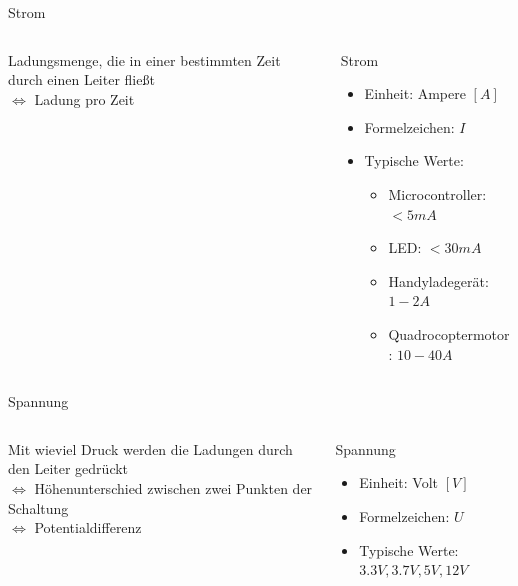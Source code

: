\documentclass[aspectratio=169]{beamer}
\begin{document}
\begin{frame}{Strom}
    \begin{columns}
        \begin{column}{0.5\textwidth}
            Ladungsmenge, die in einer bestimmten Zeit durch einen Leiter \glqq{}fließt\grqq{} \\
            \pause
            $\Leftrightarrow$ Ladung pro Zeit
        \end{column}
        \pause
        \begin{column}{0.5\textwidth}
            \begin{block}{Strom}
                \begin{itemize}
                    \item Einheit: Ampere $[\si{A}]$
                    \item Formelzeichen: $I$
                    \item Typische Werte:
                        \begin{itemize}
                            \item Microcontroller: $<5 \si{mA}$
                            \item LED: $<30 \si{mA}$
                            \item Handyladegerät: $1-2\si{A}$
                            \item Quadrocoptermotor: $10-40 \si{A}$
                        \end{itemize}
                \end{itemize}
            \end{block}
        \end{column}
    \end{columns}
\end{frame}

\begin{frame}{Spannung} \begin{columns} 
\begin{column}{0.5\textwidth} 
Mit wieviel Druck werden die Ladungen durch den Leiter \glqq{}gedrückt\grqq{} \\ \pause $\Leftrightarrow$ \glqq{}Höhenunterschied\grqq{} zwischen zwei Punkten der Schaltung \\ \pause $\Leftrightarrow$
            Potentialdifferenz
        \end{column}
        \pause
        \begin{column}{0.5\textwidth}
            \begin{block}{Spannung}
                \begin{itemize}
                    \item Einheit: Volt $[\si{V}]$
                    \item Formelzeichen: $U$
                    \item Typische Werte: $3.3 \si{V}, 3.7 \si{V}, 5 \si{V}, 12 \si{V}$
                \end{itemize}
            \end{block}
        \end{column}
    \end{columns}
\end{frame}
\end{document}
